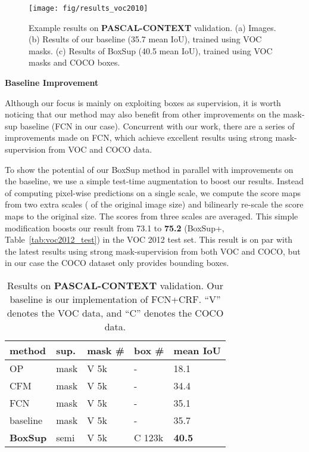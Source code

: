 \documentclass[10pt,twocolumn,letterpaper]{article}
\newcommand{\tn}[1]{\footnotesize{#1}}
\begin{document}
\begin{figure*}[t]
	\centering
	\texttt{[image: fig/results\_voc2010]}
	\caption{Example results on \textbf{PASCAL-CONTEXT} validation. (a) Images. (b) Results of our baseline (35.7 mean IoU), trained using VOC masks. (c) Results of BoxSup (40.5 mean IoU), trained using VOC masks and COCO boxes.}
	\label{fig:results_voc2010}
\end{figure*}

\vspace{8pt}
\noindent\textbf{Baseline Improvement}

Although our focus is mainly on exploiting boxes as supervision, it is worth noticing that our method may also benefit from other improvements on the mask-sup baseline (FCN in our case). Concurrent with our work, there are a series of improvements \cite{zheng2015conditional,Chen2015} made on FCN, which achieve excellent results using strong mask-supervision from VOC and COCO data.

To show the potential of our BoxSup method in parallel with improvements on the baseline, we use a simple test-time augmentation to boost our results. Instead of computing pixel-wise predictions on a single scale, we compute the score maps from two extra scales ( of the original image size) and bilinearly re-scale the score maps to the original size. The scores from three scales are averaged. This simple modification boosts our result from 73.1 to \textbf{75.2} (BoxSup+, Table~\ref{tab:voc2012_test}) in the VOC 2012 test set. This result is on par with the latest results using strong mask-supervision from both VOC and COCO, but in our case the  COCO dataset only provides bounding boxes.

\setlength{\tabcolsep}{6pt}
\renewcommand{\arraystretch}{1.1}
\begin{table}[t]
	\begin{center}
		\begin{tabular}{x|x|x|x|x}
			\hline
			method & sup. & mask \# & box \# & \tn{mean IoU}\\
			\hline
			\hline
			OP \cite{carreira2012semantic} & mask & V 5k & - & 18.1\\
			CFM \cite{Dai2015} & mask & V 5k & - & 34.4\\
			FCN \cite{Long2015} & mask & V 5k & - & 35.1\\
			\hline
			baseline & mask & V 5k & - & 35.7\\
			\textbf{BoxSup} & semi & V 5k & C 123k & \textbf{40.5}\\
			\hline
		\end{tabular}
	\end{center}
	\caption{Results on \textbf{PASCAL-CONTEXT} \cite{mottaghi2014role} validation. Our baseline is our implementation of FCN+CRF. ``V'' denotes the VOC data, and ``C'' denotes the COCO data.}
	\label{tab:voc2010_val}
\end{table}
\end{document}
